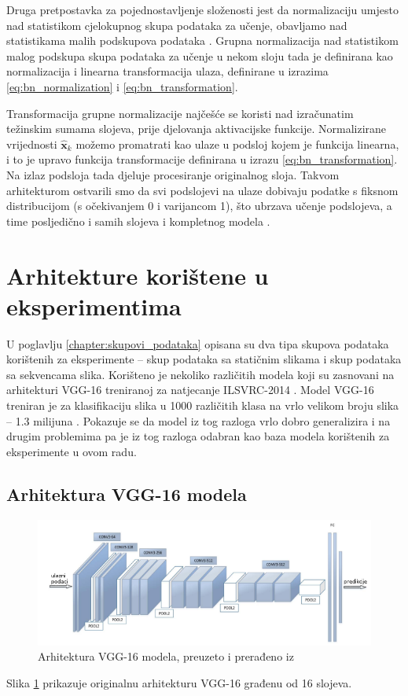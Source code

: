 \documentclass[times, utf8, diplomski, numeric]{fer}
\begin{document}
Druga pretpostavka za pojednostavljenje složenosti jest da normalizaciju umjesto nad statistikom cjelokupnog skupa podataka za učenje, obavljamo nad statistikama malih podskupova podataka .
Grupna normalizacija nad statistikom malog podskupa skupa podataka za učenje u nekom sloju tada je definirana kao normalizacija i linearna transformacija ulaza, definirane u izrazima \ref{eq:bn_normalization} i \ref{eq:bn_transformation}.

Transformacija grupne normalizacije najčešće se koristi nad izračunatim težinskim sumama slojeva, prije djelovanja aktivacijske funkcije.
Normalizirane vrijednosti $\hat{\mathbf{x}}_{k}$ možemo promatrati kao ulaze u podsloj kojem je funkcija linearna, i to je upravo funkcija transformacije definirana u izrazu \ref{eq:bn_transformation}.
Na izlaz podsloja tada djeluje procesiranje originalnog sloja. 
Takvom arhitekturom ostvarili smo da svi podslojevi na ulaze dobivaju podatke s fiksnom distribucijom (s očekivanjem 0 i varijancom 1), što ubrzava učenje podslojeva, a time posljedično i samih slojeva i kompletnog modela \citep{article:bn_paper} \citep{seminar:rela}.

\section{Arhitekture korištene u eksperimentima}
U poglavlju \ref{chapter:skupovi_podataka} opisana su dva tipa skupova podataka korištenih za eksperimente -- skup podataka sa statičnim slikama i skup podataka sa sekvencama slika.
Korišteno je nekoliko različitih modela koji su zasnovani na arhitekturi VGG-16 \citep{article:vgg} treniranoj za natjecanje ILSVRC-2014 \citep{article:ilsvrc2015}.
Model VGG-16 treniran je za klasifikaciju slika u 1000 različitih klasa na vrlo velikom broju slika -- 1.3 milijuna \citep{article:vgg}.
Pokazuje se da model iz tog razloga vrlo dobro generalizira i na drugim problemima \citep{article:vgg} pa je iz tog razloga odabran kao baza modela korištenih za eksperimente u ovom radu.

\subsection{Arhitektura VGG-16 modela}
\begin{figure}[H]
\centering
\includegraphics[scale=0.65]{images/vgg_architecture.png}
\caption{Arhitektura VGG-16 modela, preuzeto i prerađeno iz \citep{article:vgg_architecture}}
\label{img:vgg_architecture}
\end{figure}
Slika \ref{img:vgg_architecture} prikazuje originalnu arhitekturu VGG-16 građenu od 16 slojeva.
\end{document}
